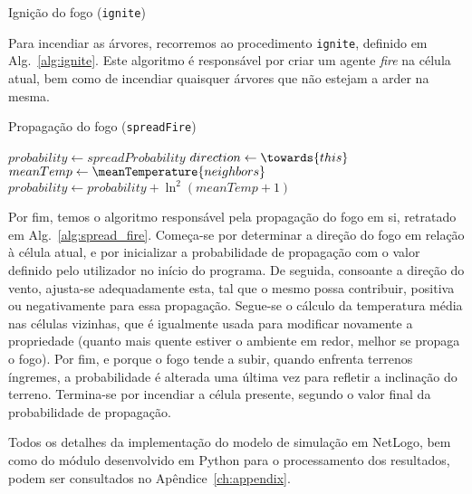 \begin{algorithm}
\caption{Ignição do fogo (\texttt{ignite})}\label{alg:ignite}
\;
\end{algorithm}

Para incendiar as árvores, recorremos ao procedimento \texttt{ignite}, definido em Alg.~\ref{alg:ignite}. Este algoritmo é responsável por criar um agente \textit{fire} na célula atual, bem como de incendiar quaisquer árvores que não estejam a arder na mesma.


\begin{algorithm}
\caption{Propagação do fogo (\texttt{spreadFire})}\label{alg:spread_fire}
$probability \gets spreadProbability$\;
$direction \gets \towards{this}$\;
$meanTemp \gets \meanTemperature{neighbors}$\;
$probability \gets probability + \ln^2{(meanTemp + 1)}$\;
\end{algorithm}

Por fim, temos o algoritmo responsável pela propagação do fogo em si, retratado em Alg.~\ref{alg:spread_fire}. Começa-se por determinar a direção do fogo em relação à célula atual, e por inicializar a probabilidade de propagação com o valor definido pelo utilizador no início do programa. De seguida, consoante a direção do vento, ajusta-se adequadamente esta, tal que o mesmo possa contribuir, positiva ou negativamente para essa propagação. Segue-se o cálculo da temperatura média nas células vizinhas, que é igualmente usada para modificar novamente a propriedade (quanto mais quente estiver o ambiente em redor, melhor se propaga o fogo). Por fim, e porque o fogo tende a subir, quando enfrenta terrenos íngremes, a probabilidade é alterada uma última vez para refletir a inclinação do terreno. Termina-se por incendiar a célula presente, segundo o valor final da probabilidade de propagação.

Todos os detalhes da implementação do modelo de simulação em NetLogo, bem como do módulo desenvolvido em Python para o processamento dos resultados, podem ser consultados no Apêndice~\ref{ch:appendix}.
